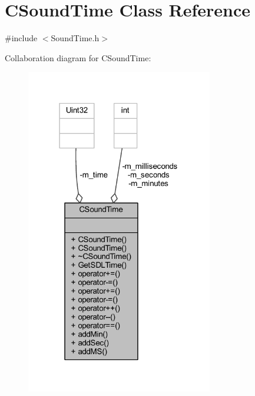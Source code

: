 \hypertarget{class_c_sound_time}{}\section{C\+Sound\+Time Class Reference}
\label{class_c_sound_time}


{\ttfamily \#include $<$Sound\+Time.\+h$>$}



Collaboration diagram for C\+Sound\+Time\+:
\nopagebreak
\begin{figure}[H]
\begin{center}
\leavevmode
\includegraphics[width=231pt]{class_c_sound_time__coll__graph}
\end{center}
\end{figure}
